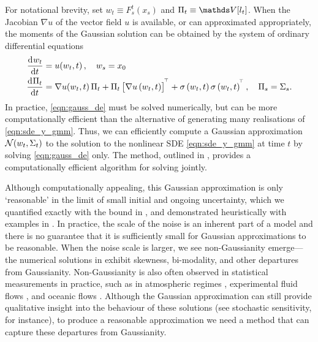 For notational brevity, set \(w_t \equiv F_s^t\!\left(x_s\right)\) and \(\Pi_t \equiv \var{l_t}\).
When the Jacobian \(\nabla u\) of the vector field \(u\) is available, or can approximated appropriately, the moments of the Gaussian solution can be obtained by the system of ordinary differential equations
\begin{subequations}\label{eqn:gauss_de}
	\begin{align}
		\dod{w_t}{t}   & = u\!\left(w_t, t\right), \quad w_s = x_0 \label{eqn:gauss_mean_de}                                                                                                           \\
		\dod{\Pi_t}{t} & = \begin{multlined}[t]
			                   \nabla u\!\left(w_t, t\right) \Pi_t + \Pi_t\left[\nabla u\left(w_t, t\right)\right]^{\T} + \sigma\left(w_t, t \right)\sigma\left(w_t, t\right)^{\T}, \quad \Pi_s = \Sigma_s.
		                   \end{multlined}
		\label{eqn:gauss_cov_de}
	\end{align}
\end{subequations}
In practice, \cref{eqn:gauss_de} must be solved numerically, but can be more computationally efficient than the alternative of generating many realisations of \cref{eqn:sde_y_gmm}.
Thus, we can efficiently compute a Gaussian approximation \(\mathcal{N}\!\left(w_t, \Sigma_t\right)\) to the solution to the nonlinear SDE \cref{eqn:sde_y_gmm} at time \(t\) by solving \cref{eqn:gauss_de} only.
The \citet{Mazzoni_2008_ComputationalAspectsContinuous} method, outlined in , provides a computationally efficient algorithm for solving  jointly.

Although computationally appealing, this Gaussian approximation is only `reasonable' in the limit of small initial and ongoing uncertainty, which we quantified exactly with the bound in , and demonstrated heuristically with examples in .
In practice, the scale of the noise is an inherent part of a model and there is no guarantee that it is sufficiently small for Gaussian approximations to be reasonable.
When the noise scale is larger, we see non-Gaussianity emerge---the numerical solutions in  exhibit skewness, bi-modality, and other departures from Gaussianity.
Non-Gaussianity is also often observed in statistical measurements in practice, such as in atmospheric regimes \citep{SuraEtAl_2005_MultiplicativeNoiseNonGaussianity}, experimental fluid flows \citep{del-Castillo-Negrete_1998_AsymmetricTransportNonGaussian}, and oceanic flows \citep{BraccoEtAl_2000_VelocityProbabilityDensity}.
Although the Gaussian approximation can still provide qualitative insight into the behaviour of these solutions (see stochastic sensitivity, for instance), to produce a reasonable approximation we need a method that can capture these departures from Gaussianity.

